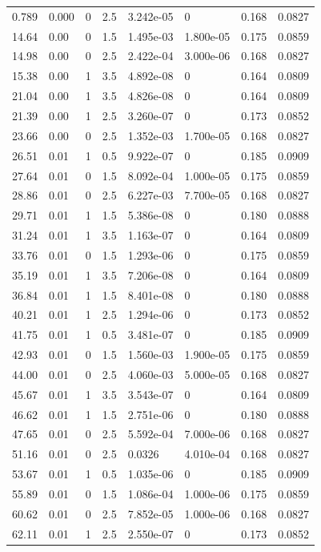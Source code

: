 \documentclass[preview]{standalone}
\begin{document}
{{\begin{tabular}{L{1.2cm}C{1.2cm} C{0.3cm}C{0.5cm} C{1.4cm}C{1.4cm} C{1.4cm}C{1.4cm}}
  0.789  &  0.000  & 0     & 2.5 &  3.242e-05  & 0  & 0.168 &  0.0827   \\ 
  14.64  &  0.00  & 0     & 1.5 &  1.495e-03  & 1.800e-05  & 0.175 &  0.0859   \\ 
  14.98  &  0.00  & 0     & 2.5 &  2.422e-04  & 3.000e-06  & 0.168 &  0.0827   \\ 
  15.38  &  0.00  & 1     & 3.5 &  4.892e-08  & 0  & 0.164 &  0.0809   \\ 
  21.04  &  0.00  & 1     & 3.5 &  4.826e-08  & 0  & 0.164 &  0.0809   \\ 
  21.39  &  0.00  & 1     & 2.5 &  3.260e-07  & 0  & 0.173 &  0.0852   \\ 
  23.66  &  0.00  & 0     & 2.5 &  1.352e-03  & 1.700e-05  & 0.168 &  0.0827   \\ 
  26.51  &  0.01  & 1     & 0.5 &  9.922e-07  & 0  & 0.185 &  0.0909   \\ 
  27.64  &  0.01  & 0     & 1.5 &  8.092e-04  & 1.000e-05  & 0.175 &  0.0859   \\ 
  28.86  &  0.01  & 0     & 2.5 &  6.227e-03  & 7.700e-05  & 0.168 &  0.0827   \\ 
  29.71  &  0.01  & 1     & 1.5 &  5.386e-08  & 0  & 0.180 &  0.0888   \\ 
  31.24  &  0.01  & 1     & 3.5 &  1.163e-07  & 0  & 0.164 &  0.0809   \\ 
  33.76  &  0.01  & 0     & 1.5 &  1.293e-06  & 0  & 0.175 &  0.0859   \\ 
  35.19  &  0.01  & 1     & 3.5 &  7.206e-08  & 0  & 0.164 &  0.0809   \\ 
  36.84  &  0.01  & 1     & 1.5 &  8.401e-08  & 0  & 0.180 &  0.0888   \\ 
  40.21  &  0.01  & 1     & 2.5 &  1.294e-06  & 0  & 0.173 &  0.0852   \\ 
  41.75  &  0.01  & 1     & 0.5 &  3.481e-07  & 0  & 0.185 &  0.0909   \\ 
  42.93  &  0.01  & 0     & 1.5 &  1.560e-03  & 1.900e-05  & 0.175 &  0.0859   \\ 
  44.00  &  0.01  & 0     & 2.5 &  4.060e-03  & 5.000e-05  & 0.168 &  0.0827   \\ 
  45.67  &  0.01  & 1     & 3.5 &  3.543e-07  & 0  & 0.164 &  0.0809   \\ 
  46.62  &  0.01  & 1     & 1.5 &  2.751e-06  & 0  & 0.180 &  0.0888   \\ 
  47.65  &  0.01  & 0     & 2.5 &  5.592e-04  & 7.000e-06  & 0.168 &  0.0827   \\ 
  51.16  &  0.01  & 0     & 2.5 &  0.0326  & 4.010e-04  & 0.168 &  0.0827   \\ 
  53.67  &  0.01  & 1     & 0.5 &  1.035e-06  & 0  & 0.185 &  0.0909   \\ 
  55.89  &  0.01  & 0     & 1.5 &  1.086e-04  & 1.000e-06  & 0.175 &  0.0859   \\ 
  60.62  &  0.01  & 0     & 2.5 &  7.852e-05  & 1.000e-06  & 0.168 &  0.0827   \\ 
  62.11  &  0.01  & 1     & 2.5 &  2.550e-07  & 0  & 0.173 &  0.0852   \\ 
\hline 
\end{tabular} 

}}
\end{document}
